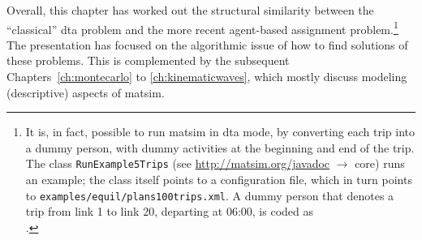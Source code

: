 Overall, this chapter has worked out the structural similarity between the 
``classical'' \gls{dta} problem and the more recent agent-based assignment problem.\footnote{%
%
%
It is, in fact, possible to run \gls{matsim} in \gls{dta} mode, by converting each trip into a dummy person, with dummy activities at the beginning and end of the trip.  The class \lstinline{RunExample5Trips} (see \url{http://matsim.org/javadoc} $\to$ core) runs an example; the class itself points to a configuration file, which in turn points to \lstinline{examples/equil/plans100trips.xml}.  A dummy person that denotes a trip from link 1 to link 20, departing at 06:00, is coded as\\
\usebox{\tripAsPlan}.
}
The presentation has focused on the algorithmic issue of how to find solutions 
of these problems. This is complemented by the subsequent Chapters~\ref{ch:montecarlo} to \ref{ch:kinematicwaves}, 
which mostly discuss modeling (descriptive) aspects of \gls{matsim}.



